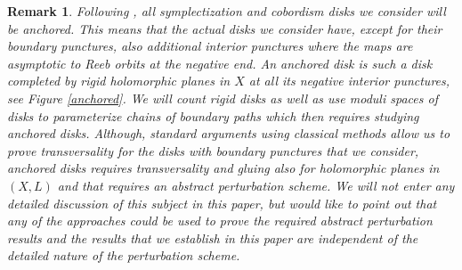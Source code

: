 \documentclass{gtpart}
\newtheorem{rem}[thm]{Remark}
\begin{document}
\begin{rem} Following \cite{BEE}, all symplectization and cobordism disks we consider will be
    anchored. This means that the actual disks we consider have, except for their boundary
    punctures, also additional interior punctures where the maps are asymptotic to Reeb orbits at
    the negative end. An anchored disk is such a disk completed by rigid holomorphic planes in $X$
    at all its negative interior punctures, see Figure \ref{anchored}. We will count rigid disks as well as
    use moduli spaces of disks to parameterize chains of boundary paths which then requires studying
    anchored disks. Although, standard arguments using classical methods allow us to prove
    transversality for the disks with boundary punctures that we consider, anchored disks requires
    transversality and gluing also for holomorphic planes in $(X,L)$ and that requires an abstract
    perturbation scheme. We will not enter any detailed discussion of this subject in this paper,
    but would like to point out that any of the approaches \cite{FOOO,Hofer,Pardon,HondaBao} could
    be used to prove the required abstract perturbation results and the results that we establish in
    this paper are independent of the detailed nature of the perturbation scheme.      \end{rem}
\end{document}
